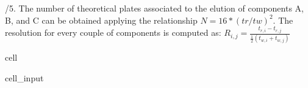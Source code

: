 \documentclass[letterpaper,10pt,english]{jupyterBook}
\begin{document}
/5. The number of theoretical plates associated to the elution of components A, B, and C can be obtained applying the relationship \(N=16*(tr/tw)^2\). The resolution for every couple of components is computed as: \(R_{i,j}=\frac{t_{r,i}-t_{r,j}}{\frac{1}{2}(t_{w,i}+t_{w,j})}\)

\begin{sphinxuseclass}{cell}\begin{sphinxVerbatimInput}

\begin{sphinxuseclass}{cell_input}
\begin{sphinxVerbatim}[commandchars=\\\{\}]

\PYG{p}{[}\PYG{p}{]} 
\PYG{p}{[}\PYG{p}{]} 
 




   
       
        \PYG{p}{[}\PYG{p}{]}\PYG{p}{[}\PYG{p}{]}\PYG{p}{[}\PYG{p}{]}\PYG{p}{[}\PYG{p}{]}\PYG{p}{[}\PYG{p}{]}



\end{sphinxVerbatim}
\end{sphinxuseclass}
\end{sphinxVerbatimInput}
\end{sphinxuseclass}
\end{document}
